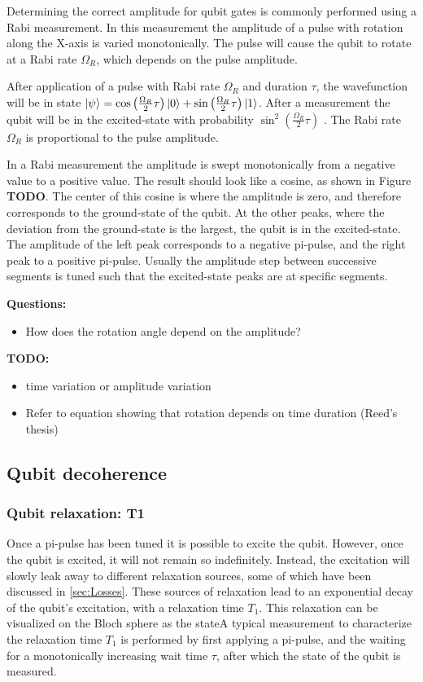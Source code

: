         Determining the correct amplitude for qubit gates is commonly performed using a Rabi measurement. In this measurement the amplitude of a pulse with rotation along the X-axis is varied monotonically. The pulse will cause the qubit to rotate at a Rabi rate $\Omega_R$, which depends on the pulse amplitude.

        After application of a pulse with Rabi rate $\Omega_R$ and duration $\tau$, the wavefunction will be in state $\ket{\psi} = \cos{\left( \frac{\Omega_R}{2} \tau \right) } \ket{0} + \sin{\left( \frac{\Omega_R}{2} \tau \right)} \ket{1}$. After a measurement the qubit will be in the excited-state with probability $\sin^2{\left( \frac{\Omega_R}{2} \tau \right)}$ \cite{Reed}. The Rabi rate $\Omega_R$ is proportional to the pulse amplitude.

        In a Rabi measurement the amplitude is swept monotonically from a negative value to a positive value. The result should look like a cosine, as shown in Figure \textbf{TODO}. The center of this cosine is where the amplitude is zero, and therefore corresponds to the ground-state of the qubit. At the other peaks, where the deviation from the ground-state is the largest, the qubit is in the excited-state. The amplitude of the left peak corresponds to a negative pi-pulse, and the right peak to a positive pi-pulse. Usually the amplitude step between successive segments is tuned such that the excited-state peaks are at specific segments.

        \textbf{Questions:}
        \begin{itemize}
          \item How does the rotation angle depend on the amplitude?
        \end{itemize}
        \textbf{TODO:}
        \begin{itemize}
          \item time variation or amplitude variation
          \item Refer to equation showing that rotation depends on time duration (Reed's thesis)
        \end{itemize}

      \subsection{Qubit decoherence}

        \subsubsection{Qubit relaxation: T1}
          Once a pi-pulse has been tuned it is possible to excite the qubit. However, once the qubit is excited, it will not remain so indefinitely. Instead, the excitation will slowly leak away to different relaxation sources, some of which have been discussed in \ref{sec:Losses}. These sources of relaxation lead to an exponential decay of the qubit's excitation, with a relaxation time $T_1$. This relaxation can be visualized on the Bloch sphere as the stateA typical measurement to characterize the relaxation time $T_1$ is performed by first applying a pi-pulse, and the waiting for a monotonically increasing wait time $\tau$, after which the state of the qubit is measured.


